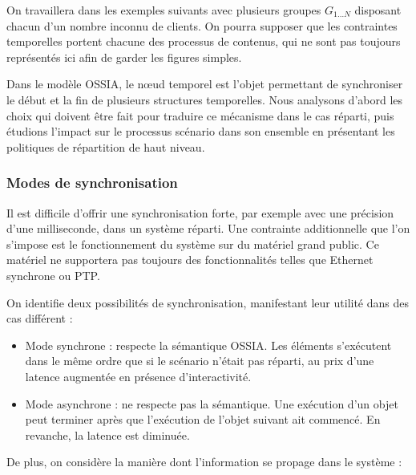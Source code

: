 \documentclass[10pt]{article}
\newcommand\ossia{OSSIA\xspace}
\begin{document}
On travaillera dans les exemples suivants avec plusieurs groupes $G_{1\dots N}$ disposant chacun d'un nombre inconnu de clients. 
On pourra supposer que les contraintes temporelles portent chacune des processus de contenus, qui ne sont pas toujours représentés ici afin de garder les figures simples.

Dans le modèle \ossia, le nœud temporel est l'objet permettant de synchroniser le début et la fin de plusieurs structures temporelles. 
Nous analysons d'abord les choix qui doivent être fait pour traduire ce mécanisme dans le cas réparti, puis étudions l'impact sur le processus scénario dans son ensemble en présentant les politiques de répartition de haut niveau.
\subsubsection{Modes de synchronisation}
Il est difficile d'offrir une synchronisation forte, par exemple avec une précision d'une milliseconde, dans un système réparti\cite{sheehy2015there}. 
Une contrainte additionnelle que l'on s'impose est le fonctionnement du système sur du matériel grand public. 
Ce matériel ne supportera pas toujours des fonctionnalités telles que Ethernet synchrone\cite{ferrant2008synchronous} ou PTP.


On identifie deux possibilités de synchronisation, manifestant leur utilité dans des cas différent : 
\begin{itemize}
	\item Mode synchrone : respecte la sémantique \ossia{}. Les éléments s'exécutent dans le même ordre que si le scénario n'était pas réparti, au prix d'une latence augmentée en présence d'interactivité.
	\item Mode asynchrone : ne respecte pas la sémantique. Une exécution d'un objet peut terminer après que l'exécution de l'objet suivant ait commencé. En revanche, la latence est diminuée.    
\end{itemize}

De plus, on considère la manière dont l'information se propage dans le système :
\end{document}

